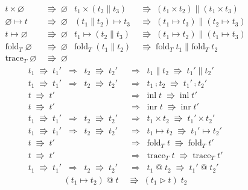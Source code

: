 \documentclass[a4j, dvipdfmx]{jsarticle}
\theoremstyle{definition}
\newcommand{\reduct}[2]{#1 &\;\Rrightarrow\; #2}
\newcommand{\reduction}[2]{#1 \;\Rrightarrow\; #2}
\begin{document}
\begin{figure}[H]
\begin{align*}
    \reduct{t\times\varnothing}{\varnothing} &
    \reduct{t_1\times(t_2\parallel{}t_3)}{(t_1\times{}t_2)\parallel(t_1\times{}t_3)} \\
    \reduct{\varnothing\mapsto{}t}{\varnothing} &
    \reduct{(t_1\parallel{}t_2)\mapsto{}t_3}{(t_1\mapsto{}t_3)\parallel(t_2\mapsto{}t_3)} \\
    \reduct{t\mapsto\varnothing}{\varnothing} &
    \reduct{t_1\mapsto(t_2\parallel{}t_3)}{(t_1\mapsto{}t_2)\parallel(t_1\mapsto{}t_3)} \\
    \reduct{\text{fold}_T\;\varnothing}{\varnothing} &
    \reduct{\text{fold}_T\;(t_1\parallel{}t_2)}{\text{fold}_T\;t_1\parallel\text{fold}_T\;t_2} \\
    \reduct{\text{trace}_T\;\varnothing}{\varnothing}
  \end{align*}
  \begin{align*}
    \reduction{t_1}{t_1'} \;\;\Longrightarrow\;\; \reduction{t_2}{t_2'} &\;\;\Longrightarrow\;\; \reduction{t_1\parallel{}t_2}{t_1'\parallel{}t_2'} \\
    \reduction{t_1}{t_1'} \;\;\Longrightarrow\;\; \reduction{t_2}{t_2'} &\;\;\Longrightarrow\;\; \reduction{t_1\fcmp{}t_2}{t_1'\fcmp{}t_2'} \\
    \reduction{t}{t'} &\;\;\Longrightarrow\;\; \reduction{\text{inl}\;t}{\text{inl}\;t'} \\
    \reduction{t}{t'} &\;\;\Longrightarrow\;\; \reduction{\text{inr}\;t}{\text{inr}\;t'} \\
    \reduction{t_1}{t_1'} \;\;\Longrightarrow\;\; \reduction{t_2}{t_2'} &\;\;\Longrightarrow\;\; \reduction{t_1\times{}t_2}{t_1'\times{}t_2'} \\
    \reduction{t_1}{t_1'} \;\;\Longrightarrow\;\; \reduction{t_2}{t_2'} &\;\;\Longrightarrow\;\; \reduction{t_1\mapsto{}t_2}{t_1'\mapsto{}t_2'} \\
    \reduction{t}{t'} &\;\;\Longrightarrow\;\; \reduction{\text{fold}_T\;t}{\text{fold}_T\;t'} \\
    \reduction{t}{t'} &\;\;\Longrightarrow\;\; \reduction{\text{trace}_T\;t}{\text{trace}_T\;t'} \\
    \reduction{t_1}{t_1'} \;\;\Longrightarrow\;\; \reduction{t_2}{t_2'} &\;\;\Longrightarrow\;\; \reduction{t_1\;\text{@}\;t_2}{t_1'\;\text{@}\;t_2'}
  \end{align*}
  \begin{align*}
    \reduct{(t_1\mapsto{}t_2)\;\text{@}\;t}{(t_1\triangleright{}t)\;t_2}
  \end{align*}

\end{figure}
\end{document}
